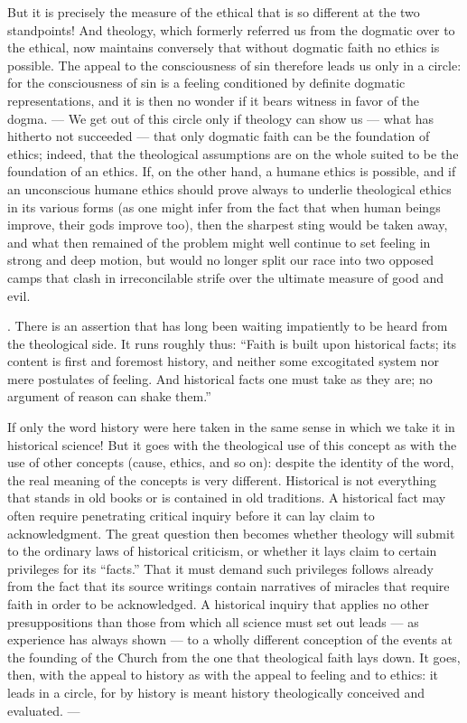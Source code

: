 \documentclass[12pt,a4paper]{article}
\begin{document}
But it is precisely the measure of the ethical that is so different at the two
standpoints! And theology, which formerly referred us from the dogmatic over to
the ethical, now maintains conversely that without dogmatic faith no ethics is
possible. The appeal to the consciousness of sin therefore leads us only in a
circle: for the consciousness of sin is a feeling conditioned by definite
dogmatic representations, and it is then no wonder if it bears witness in favor
of the dogma. --- We get out of this circle only if theology can show us --- what
has hitherto not succeeded --- that only dogmatic faith can be the foundation of
ethics; indeed, that the theological assumptions are on the whole suited to be
the foundation of an ethics. If, on the other hand, a humane ethics is possible,
and if an unconscious humane ethics should prove always to underlie theological
ethics in its various forms (as one might infer from the fact that when human
beings improve, their gods improve too), then the sharpest sting would be taken
away, and what then remained of the problem might well continue to set feeling
in strong and deep motion, but would no longer split our race into two opposed
camps that clash in irreconcilable strife over the ultimate measure of good and
evil.

\medskip
{}. There is an assertion that has long been waiting impatiently to be
heard from the theological side. It runs roughly thus: ``Faith is built upon
historical facts; its content is first and foremost history, and neither some
excogitated system nor mere postulates of feeling. And historical facts one must
take as they are; no argument of reason can shake them.''

If only the word history were here taken in the same sense in which we take it in
historical science! But it goes with the theological use of this concept as with
the use of other concepts (cause, ethics, and so on): despite the identity of the
word, the real meaning of the concepts is very different. Historical is not
everything that stands in old books or is contained in old traditions. A
historical fact may often require penetrating critical inquiry before it can lay
claim to acknowledgment. The great question then becomes whether theology will
submit to the ordinary laws of historical criticism, or whether it lays claim to
certain privileges for its ``facts.'' That it must demand such privileges follows
already from the fact that its source writings contain narratives of miracles
that require faith in order to be acknowledged. A historical inquiry that applies
no other presuppositions than those from which all science must set out leads ---
as experience has always shown --- to a wholly different conception of the events
at the founding of the Church from the one that theological faith lays down. It
goes, then, with the appeal to history as with the appeal to feeling and to
ethics: it leads in a circle, for by history is meant history theologically
conceived and evaluated. ---
\end{document}
